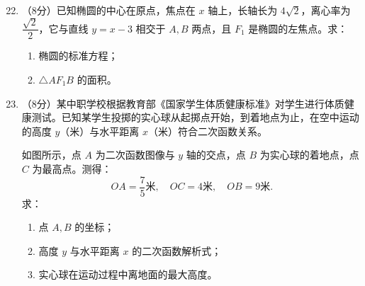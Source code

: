 \documentclass[12pt,a4paper]{ctexart}
\begin{document}
\begin{enumerate}
    \setcounter{enumi}{21}
    \item （8分）已知椭圆的中心在原点，焦点在 $x$ 轴上，长轴长为 $4\sqrt{2}$，离心率为 $\dfrac{\sqrt{2}}{2}$，它与直线 $y = x - 3$ 相交于 $A,B$ 两点，且 $F_1$ 是椭圆的左焦点。求：
    \begin{enumerate}
        \item 椭圆的标准方程；
        \item $\triangle AF_1B$ 的面积。
    \end{enumerate}

    \item （8分）某中职学校根据教育部《国家学生体质健康标准》对学生进行体质健康测试。已知某学生投掷的实心球从起掷点开始，到着地点为止，在空中运动的高度 $y$（米）与水平距离 $x$（米）符合二次函数关系。

    如图所示，点 $A$ 为二次函数图像与 $y$ 轴的交点，点 $B$ 为实心球的着地点，点 $C$ 为最高点。测得：
    \[
    OA = \frac{7}{5}\text{米}, \quad OC = 4\text{米}, \quad OB = 9\text{米}.
    \]
    求：
    \begin{enumerate}
        \item 点 $A,B$ 的坐标；
        \item 高度 $y$ 与水平距离 $x$ 的二次函数解析式；
        \item 实心球在运动过程中离地面的最大高度。
    \end{enumerate}
\end{enumerate}
\end{document}
